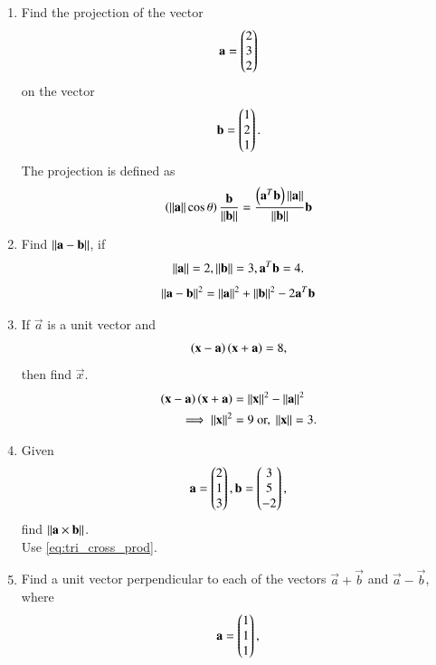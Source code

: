 \begin{enumerate}[label=\arabic*.,ref=\thesubsection.\theenumi]
\item Find the projection of the vector 
\begin{align}
\mathbf{a} = \begin{pmatrix}2\\3\\2\end{pmatrix}
\end{align}
on the vector
\begin{align}
\mathbf{b}=\begin{pmatrix}1\\2\\1\end{pmatrix}.
\end{align}
%
\solution The projection is defined as 
\begin{align}
\left(\left\lVert\mathbf{a}\right\rVert\cos\theta\right) \frac{\mathbf{b}}{\left\lVert\mathbf{b}\right\rVert}
=  \frac{\left(\mathbf{a}^T\mathbf{b}\right)\left\lVert\mathbf{a}\right\rVert}{\left\lVert\mathbf{b}\right\rVert}\mathbf{b}
\end{align}
\item Find $\left\lVert\mathbf{a}-\mathbf{b}\right\rVert$, if 
\begin{align}
\left\lVert\mathbf{a}\right\rVert = 2, 
\left\lVert\mathbf{b}\right\rVert = 3,
\mathbf{a}^T\mathbf{b} = 4.
\end{align}
%
\solution 
%
\begin{align}
\left\lVert\mathbf{a}-\mathbf{b}\right\rVert^2 = \left\lVert\mathbf{a}\right\rVert^2+\left\lVert\mathbf{b}\right\rVert^2
-2\mathbf{a}^T\mathbf{b}
\end{align}
%
\item If $\vec{a}$ is a unit vector and 
%
\begin{align}
\left(\mathbf{x}-\mathbf{a}\right)\left(\mathbf{x}+\mathbf{a}\right) = 8, 
\end{align}
%
then find $\vec{x}$.
%
\\
\solution 
%
\begin{align}
\left(\mathbf{x}-\mathbf{a}\right)\left(\mathbf{x}+\mathbf{a}\right) &= \left\lVert\mathbf{x}\right\rVert^2-\left\lVert\mathbf{a}\right\rVert^2
\\
\implies \left\lVert\mathbf{x}\right\rVert^2 &= 9 \text{ or, } \left\lVert\mathbf{x}\right\rVert = 3.
\end{align}
%
\item Given
\begin{align}
\mathbf{a}=\begin{pmatrix}2\\1\\3\end{pmatrix},
\mathbf{b}=\begin{pmatrix}3\\5\\-2\end{pmatrix},
\end{align}
find $\left\lVert\mathbf{a} \times \mathbf{b}\right\rVert$.
%
\\
\solution Use \eqref{eq:tri_cross_prod}.
%
\item Find a unit vector perpendicular to each of the vectors
$\vec{a}+\vec{b}$ and $\vec{a}-\vec{b}$, where 
\begin{align}
\vec{a}=\myvec{1\\1\\1},

\end{align}
\end{enumerate}

